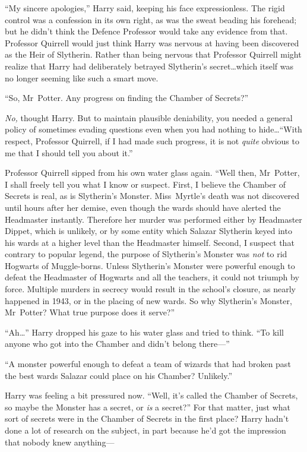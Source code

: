 “My sincere apologies,” Harry said, keeping his face expressionless. The rigid control was a confession in its own right, as was the sweat beading his forehead; but he didn’t think the Defence Professor would take any evidence from that. Professor Quirrell would just think Harry was nervous at having been discovered as the Heir of Slytherin. Rather than being nervous that Professor Quirrell might realize that Harry had deliberately betrayed Slytherin’s secret…which itself was no longer seeming like such a smart move.

“So, Mr~Potter. Any progress on finding the Chamber of Secrets?”

\emph{No,} thought Harry. But to maintain plausible deniability, you needed a general policy of sometimes evading questions even when you had nothing to hide…“With respect, Professor Quirrell, if I had made such progress, it is not \emph{quite} obvious to me that I should tell you about it.”

Professor Quirrell sipped from his own water glass again. “Well then, Mr~Potter, I shall freely tell you what I know or suspect. First, I believe the Chamber of Secrets is real, as is Slytherin’s Monster. Miss~Myrtle’s death was not discovered until hours after her demise, even though the wards should have alerted the Headmaster instantly. Therefore her murder was performed either by Headmaster Dippet, which is unlikely, or by some entity which Salazar Slytherin keyed into his wards at a higher level than the Headmaster himself. Second, I suspect that contrary to popular legend, the purpose of Slytherin’s Monster was \emph{not} to rid Hogwarts of Muggle-borns. Unless Slytherin’s Monster were powerful enough to defeat the Headmaster of Hogwarts and all the teachers, it could not triumph by force. Multiple murders in secrecy would result in the school’s closure, as nearly happened in 1943, or in the placing of new wards. So why Slytherin’s Monster, Mr~Potter? What true purpose does it serve?”

“Ah…” Harry dropped his gaze to his water glass and tried to think. “To kill anyone who got into the Chamber and didn’t belong there—”

“A monster powerful enough to defeat a team of wizards that had broken past the best wards Salazar could place on his Chamber? Unlikely.”

Harry was feeling a bit pressured now. “Well, it’s called the Chamber of Secrets, so maybe the Monster has a secret, or \emph{is} a secret?” For that matter, just what sort of secrets were in the Chamber of Secrets in the first place? Harry hadn’t done a lot of research on the subject, in part because he’d got the impression that nobody knew anything—

